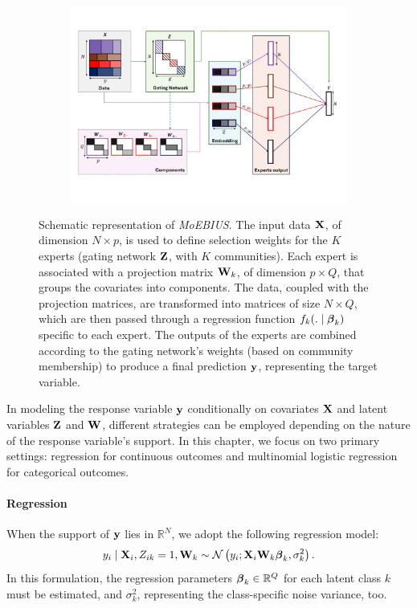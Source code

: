 \begin{figure}[!ht]
     \centering
     \begin{subfigure}[b]{\textwidth}
         \centering
         \includegraphics[width=\textwidth]{Figures/CocoLBMoE.png}
     \end{subfigure}
     \hfill
     \caption{ Schematic representation of \textit{MoEBIUS}.
     The input data \( \mathbf{X} \), of dimension \( N \times p \), is used to define selection weights for the $K$ experts (gating network $\mathbf{Z}$, with $K$ communities).
     Each expert is associated with a projection matrix \( \mathbf{W}_k \), of dimension \( p \times Q \), that groups the covariates into components. The data, coupled with the projection matrices, are transformed into matrices of size \( N \times Q \), which are then passed through a regression function \( f_k(. \mid \boldsymbol{\beta}_k) \) specific to each expert. 
     The outputs of the experts are combined according to the gating network's weights (based on community membership) to produce a final prediction \( \mathbf{y} \), representing the target variable.}
     \label{fig: CocoLBMoE}
\end{figure}

In modeling the response variable $\mathbf{y}$ conditionally on covariates $\mathbf{X}$ and latent variables $\mathbf{Z}$ and $\mathbf{W}$, different strategies can be employed depending on the nature of the response variable's support.
In this chapter, we focus on two primary settings: regression for continuous outcomes and multinomial logistic regression for categorical outcomes.

\paragraph{Regression} When the support of $\mathbf{y}$ lies in $\mathbb{R}^N$, we adopt the following regression model:
\begin{equation}
y_i \mid \mathbf{X}_i, Z_{ik} = 1, \mathbf{W}_{k} \sim \mathcal{N}\left(y_i; \mathbf{X}_i \mathbf{W}_{k} \boldsymbol{\beta}_k, \sigma^2_k \right) .
\label{eq: reg_CCLBM} 
\end{equation}
In this formulation, the regression parameters $\boldsymbol{\beta}_k \in \mathbb{R}^Q$ for each latent class $k$ must be estimated, and $\sigma^2_k$, representing the class-specific noise variance, too.

